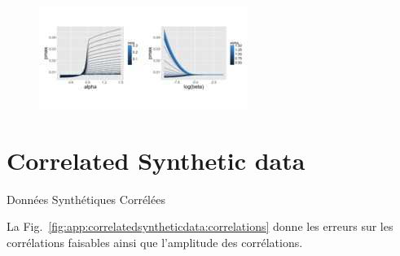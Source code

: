 \begin{figure}[h!]
\includegraphics[width=\linewidth]{Figures/Final/A-density-pmax.jpg}
\end{figure}








\newpage

\section{Correlated Synthetic data}{Données Synthétiques Corrélées}

\label{app:sec:correlatedsyntheticdata}




La Fig.~\ref{fig:app:correlatedsyntheticdata:correlations} donne les erreurs sur les corrélations faisables ainsi que l'amplitude des corrélations.


